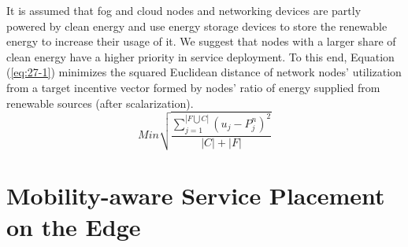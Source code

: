 \documentclass[twocolumn]{article}
\begin{document}
\par It is assumed that fog and cloud nodes and networking devices are partly powered by clean energy and use energy storage devices\cite{ghiassi2014toward} to store the renewable energy to increase their usage of it. We suggest that nodes with a larger share of clean energy have a higher priority in service deployment. To this end, Equation (\ref{eq:27-1}) minimizes the squared Euclidean distance of network nodes' utilization from a target incentive vector formed by nodes' ratio of energy supplied from renewable sources (after scalarization). 
\begin{equation}
Min \sqrt{\frac{\sum_{j=1}^{|F \bigcup C|}(u_{j}-P^{n}_{j})^2}{|C|+|F|}}
\label{eq:27-1}
\end{equation}

\section{Mobility-aware Service Placement on the Edge }
\end{document}
